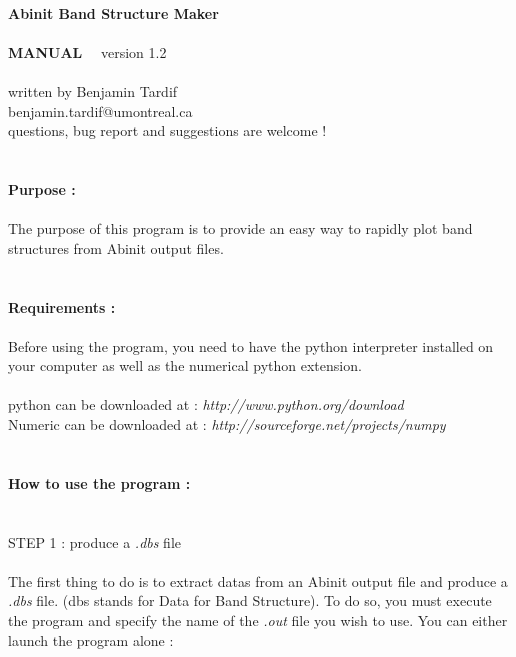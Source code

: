 \documentclass{article}
\begin{document}
\
\\
{\huge\textbf{Abinit Band Structure Maker \\ \\ MANUAL}} \ \ version 1.2 \\
\\
written by Benjamin Tardif \\
benjamin.tardif@umontreal.ca \\
questions, bug report and suggestions are welcome ! \\
\\
\\
{\Large\textbf{Purpose :}} \\
\\
The purpose of this program is to provide an easy way to rapidly plot band structures from Abinit output files. \\
\\
\\
{\Large\textbf{Requirements :}} \\
\\
Before using the program, you need to have the python interpreter installed on your computer as well as the numerical python extension. \\
\\
python can be downloaded at : \textit{http://www.python.org/download} \\
Numeric can be downloaded at : \textit{http://sourceforge.net/projects/numpy} \\
\\
\\
{\Large\textbf{How to use the program :}} \\
\\
\\
{\large{STEP 1 : produce a \textit{.dbs} file}} \\
\\
The first thing to do is to extract datas from an Abinit output file and produce a \textit{.dbs} file. (dbs stands for Data for Band Structure).
To do so, you must execute the program and specify the name of the \textit{.out} file you wish to use. You can either launch the program alone : \\
\end{document}
